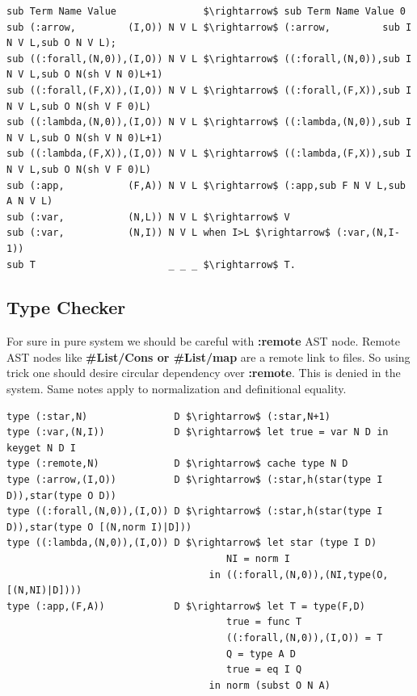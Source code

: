 \documentclass[11pt,oneside]{article}
\begin{document}
\begin{lstlisting}[mathescape=true]
sub Term Name Value               $\rightarrow$ sub Term Name Value 0
sub (:arrow,         (I,O)) N V L $\rightarrow$ (:arrow,         sub I N V L,sub O N V L);
sub ((:forall,(N,0)),(I,O)) N V L $\rightarrow$ ((:forall,(N,0)),sub I N V L,sub O N(sh V N 0)L+1)
sub ((:forall,(F,X)),(I,O)) N V L $\rightarrow$ ((:forall,(F,X)),sub I N V L,sub O N(sh V F 0)L)
sub ((:lambda,(N,0)),(I,O)) N V L $\rightarrow$ ((:lambda,(N,0)),sub I N V L,sub O N(sh V N 0)L+1)
sub ((:lambda,(F,X)),(I,O)) N V L $\rightarrow$ ((:lambda,(F,X)),sub I N V L,sub O N(sh V F 0)L)
sub (:app,           (F,A)) N V L $\rightarrow$ (:app,sub F N V L,sub A N V L)
sub (:var,           (N,L)) N V L $\rightarrow$ V
sub (:var,           (N,I)) N V L when I>L $\rightarrow$ (:var,(N,I-1))
sub T                       _ _ _ $\rightarrow$ T.
\end{lstlisting}


\subsection{Type Checker}

For sure in pure system we should be careful with {\bf :remote} AST node. Remote
AST nodes like {\bf \#List/Cons or \#List/map} are a remote link to files. So using
trick one should desire circular dependency over {\bf :remote}. This is denied in
the system. Same notes apply to normalization and definitional equality.

\begin{lstlisting}[mathescape=true]
type (:star,N)               D $\rightarrow$ (:star,N+1)
type (:var,(N,I))            D $\rightarrow$ let true = var N D in keyget N D I
type (:remote,N)             D $\rightarrow$ cache type N D
type (:arrow,(I,O))          D $\rightarrow$ (:star,h(star(type I D)),star(type O D))
type ((:forall,(N,0)),(I,O)) D $\rightarrow$ (:star,h(star(type I D)),star(type O [(N,norm I)|D]))
type ((:lambda,(N,0)),(I,O)) D $\rightarrow$ let star (type I D)
                                      NI = norm I
                                   in ((:forall,(N,0)),(NI,type(O,[(N,NI)|D])))
type (:app,(F,A))            D $\rightarrow$ let T = type(F,D)
                                      true = func T
                                      ((:forall,(N,0)),(I,O)) = T
                                      Q = type A D
                                      true = eq I Q
                                   in norm (subst O N A)
\end{lstlisting}
\end{document}
